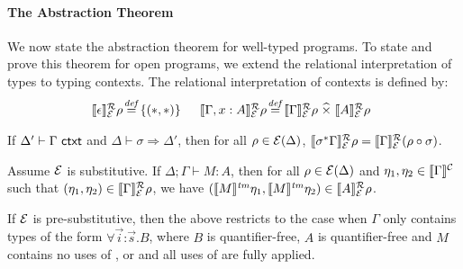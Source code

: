 \paragraph{The Abstraction Theorem}

We now state the abstraction theorem for well-typed programs. To state
and prove this theorem for open programs, we extend the
relational interpretation of types to typing contexts. The relational
interpretation of contexts is defined by: %
\begin{displaymath}
  \begin{array}{@{}l@{\hspace{0.1em}\isDefinedAs\hspace{0.1em}}l@{\hspace{1.5em}}l@{\hspace{0.1em}\isDefinedAs\hspace{0.1em}}l}
    \rsem{\epsilon}{\relEnv{E}}{\rho} & \{(*,*)\} &
    \rsem{\Gamma, x : A}{\relEnv{E}}{\rho} & \rsem{\Gamma}{\relEnv{E}}\rho \relTimes \rsem{A}{\relEnv{E}}\rho
  \end{array}
\end{displaymath}
\begin{lemma}\label{lem:ctxtsubst-rel}
  If $\Delta' \vdash \Gamma \textsf{ ctxt}$ and $\Delta \vdash \sigma
  \Rightarrow \Delta'$, then for all $\rho \in \mathcal{E}(\Delta)$,
  $\llbracket \sigma^*\Gamma \rrbracket^{\mathcal{R}}_{\mathcal{E}}{\rho} =
  \llbracket \Gamma \rrbracket^{\mathcal{R}}_{\mathcal{E}}{(\rho \circ \sigma)}$.
\end{lemma}

\begin{theorem}[Abstraction]\label{thm:abstraction}
  Assume $\mathcal{E}$ is substitutive. If $\Delta; \Gamma \vdash M :
  A$, then for all $\rho \in \mathcal{E}(\Delta)$ and $\eta_1, \eta_2
  \in \llbracket \Gamma \rrbracket^{\mathcal{C}}$ such that $(\eta_1, \eta_2) \in
  \llbracket \Gamma \rrbracket^{\mathcal{R}}_{\mathcal{E}}{\rho}$, we have $(\llbracket M \rrbracket^{\mathit{tm}}\eta_1,
  \llbracket M \rrbracket^{\mathit{tm}}\eta_2) \in \llbracket A \rrbracket^{\mathcal{R}}_{\mathcal{E}}{\rho}$.

  If $\mathcal{E}$ is pre-substitutive, then the above restricts to the
  case when $\Gamma$ only contains types of the form $\forall
  \vec{i}\mathord:\vec{s}. B$, where $B$ is quantifier-free, $A$ is
  quantifier-free and $M$ contains no uses of ,
   or  and all uses of
   are fully applied.
\end{theorem}

